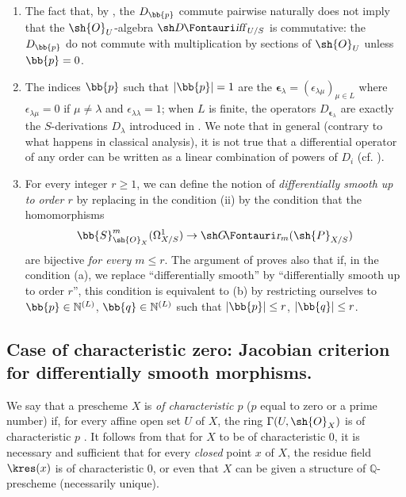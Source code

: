 \begin{remarks}[16.11.3]
\label{IV.16.11.3}
\begin{enumerate}
  \item[\rm{(i)}] The fact that, by , the $D_\bb{p}$ commute pairwise naturally does not imply that the $\sh{O}_U$-algebra $\shDiff_{U/S}$ is commutative: the $D_\bb{p}$ do not commute with multiplication by sections of $\sh{O}_U$ unless $\bb{p} = 0$.
  \item[\rm{(ii)}] The indices $\bb{p}$ such that $|\bb{p}| = 1$ are the $\pmb{\epsilon}_\lambda =  (\epsilon_{\lambda\mu})_{\mu \in L}$ where $\epsilon_{\lambda\mu} = 0$ if $\mu \neq \lambda$ and $\epsilon_{\lambda\lambda} = 1$;
  when $L$ is finite, the operators $D_{\pmb{\epsilon}_\lambda}$ are exactly the $S$-derivations $D_\lambda$ introduced in .
  We note that in general (contrary to what happens in classical analysis), it is not true that a differential operator of any order can be written as a linear combination of powers of $D_i$ (cf. ). 
  \item[\rm{(iii)}] For every integer $r \geq 1$, we can define the notion of \emph{differentially smooth up to order $r$} by replacing in  the condition (ii) by the condition that the homomorphisms
  \[
    \bb{S}_{\sh{O}_X}^m(\Omega_{X/S}^1) \to \shGr_m(\sh{P}_{X/S})
  \]
  are bijective \emph{for every $m \leq r$}.
  The argument of  proves also that if, in the condition (a), we replace ``differentially smooth'' by ``differentially smooth up to order $r$'', this condition is equivalent to (b) by restricting ourselves to $\bb{p} \in \mathbb{N}^{(L)}$, $\bb{q} \in \mathbb{N}^{(L)}$  such that $|\bb{p}| \leq r$, $|\bb{q}| \leq r$.
\end{enumerate}
\end{remarks}

\subsection{Case of characteristic zero: Jacobian criterion for differentially smooth morphisms.}
\label{IV.16.12}

\begin{env}[16.12.1]
\label{IV.16.12.1}
We say that a prescheme $X$ is \emph{of characteristic $p$} ($p$ equal to zero or a prime number) if, for every affine open set $U$ of $X$, the ring $\Gamma(U, \sh{O}_X)$ is of characteristic $p$ .
It follows from  that for $X$ to be of characteristic $0$, it is necessary and sufficient that for every \emph{closed} point $x$ of $X$, the residue field $\kres(x)$ is of characteristic $0$, or even that $X$ can be given a structure of $\mathbb{Q}$-prescheme (necessarily unique).
\end{env}

